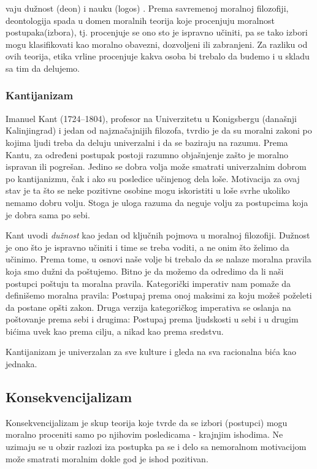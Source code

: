 \documentclass[a4paper]{article}
\begin{document}
vaju dužnost (deon) i nauku (logos) \cite{stanford}. Prema savremenoj moralnoj filozofiji, deontologija spada u domen moralnih teorija koje procenjuju moralnost postupaka(izbora), tj. procenjuje se ono sto je ispravno učiniti, pa se tako izbori mogu klasifikovati kao moralno obavezni, dozvoljeni ili zabranjeni. Za razliku od ovih teorija, etika vrline procenjuje kakva osoba bi trebalo da budemo i u skladu sa tim da delujemo.

\subsubsection{Kantijanizam}

Imanuel Kant (1724–1804), profesor na Univerzitetu u Konigsbergu (današnji Kalinjingrad) i jedan od najznačajnijih filozofa, tvrdio je da su moralni zakoni po kojima ljudi treba da deluju univerzalni i da se baziraju na razumu. 
Prema Kantu, za određeni postupak postoji razumno objašnjenje zašto je moralno ispravan ili pogrešan.
Jedino se dobra volja može smatrati univerzalnim dobrom po kantijanizmu, čak i ako su posledice učinjenog dela loše.
Motivacija za ovaj stav je ta što se neke pozitivne osobine mogu iskoristiti u loše svrhe ukoliko nemamo dobru volju.
Stoga je uloga razuma da neguje volju za postupcima koja je dobra sama po sebi.

Kant uvodi \textit{dužnost} kao jedan od ključnih pojmova u moralnoj filozofiji. Dužnost je ono što je ispravno učiniti i time se treba voditi, a ne onim što želimo da učinimo.
Prema tome, u osnovi naše volje bi trebalo da se nalaze moralna pravila koja smo dužni da poštujemo. Bitno je da možemo da odredimo da li naši postupci poštuju ta moralna pravila.
Kategorički imperativ nam pomaže da definišemo moralna pravila: Postupaj prema onoj maksimi za koju možeš poželeti da postane opšti zakon.
Druga verzija kategoričkog imperativa se oslanja na poštovanje prema sebi i drugima: Postupaj prema ljudskosti u sebi i u drugim bićima uvek kao prema cilju, a nikad kao prema sredstvu.

Kantijanizam je univerzalan za sve kulture i gleda na sva racionalna bića kao jednaka.

\subsection{Konsekvencijalizam}
Konsekvencijalizam je skup teorija koje tvrde da se izbori (postupci) mogu moralno proceniti samo po njihovim posledicama - krajnjim ishodima. Ne uzimaju se u obzir razlozi iza postupka pa se i delo sa nemoralnom motivacijom može smatrati moralnim dokle god je ishod pozitivan. 
\end{document}
